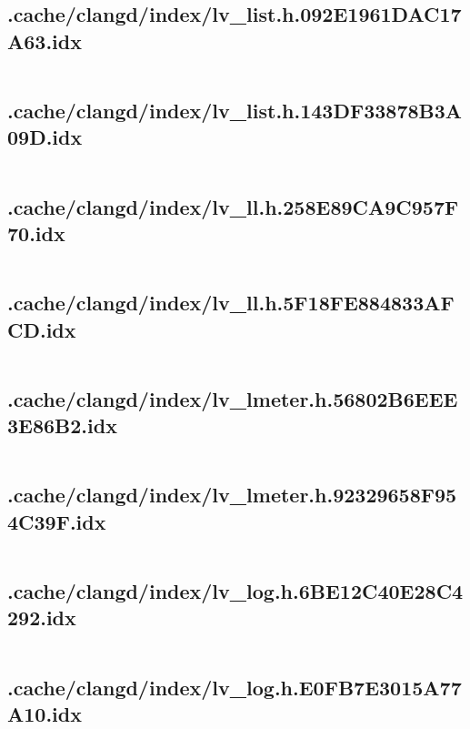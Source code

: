 \subsection{.cache/clangd/index/lv_list.h.092E1961DAC17A63.idx}
\inputminted[linenos,tabsize=2,breaklines, breakanywhere]{c}{lv_list.h.092E1961DAC17A63.idx}
\pagebreak

\subsection{.cache/clangd/index/lv_list.h.143DF33878B3A09D.idx}
\inputminted[linenos,tabsize=2,breaklines, breakanywhere]{c}{lv_list.h.143DF33878B3A09D.idx}
\pagebreak

\subsection{.cache/clangd/index/lv_ll.h.258E89CA9C957F70.idx}
\inputminted[linenos,tabsize=2,breaklines, breakanywhere]{c}{lv_ll.h.258E89CA9C957F70.idx}
\pagebreak

\subsection{.cache/clangd/index/lv_ll.h.5F18FE884833AFCD.idx}
\inputminted[linenos,tabsize=2,breaklines, breakanywhere]{c}{lv_ll.h.5F18FE884833AFCD.idx}
\pagebreak

\subsection{.cache/clangd/index/lv_lmeter.h.56802B6EEE3E86B2.idx}
\inputminted[linenos,tabsize=2,breaklines, breakanywhere]{c}{lv_lmeter.h.56802B6EEE3E86B2.idx}
\pagebreak

\subsection{.cache/clangd/index/lv_lmeter.h.92329658F954C39F.idx}
\inputminted[linenos,tabsize=2,breaklines, breakanywhere]{c}{lv_lmeter.h.92329658F954C39F.idx}
\pagebreak

\subsection{.cache/clangd/index/lv_log.h.6BE12C40E28C4292.idx}
\inputminted[linenos,tabsize=2,breaklines, breakanywhere]{c}{lv_log.h.6BE12C40E28C4292.idx}
\pagebreak

\subsection{.cache/clangd/index/lv_log.h.E0FB7E3015A77A10.idx}
\inputminted[linenos,tabsize=2,breaklines, breakanywhere]{c}{lv_log.h.E0FB7E3015A77A10.idx}
\pagebreak

